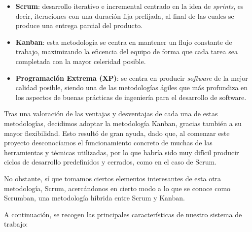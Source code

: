\begin{itemize}
	\item [\textbullet] \textbf{Scrum}: desarrollo iterativo e incremental centrado en la idea de \emph{sprints}, es decir, iteraciones con una duración fija prefijada, al final de las cuales se produce una entrega parcial del producto.
	\item [\textbullet] \textbf{Kanban}: esta metodología se centra en mantener un flujo constante de trabajo, maximizando la eficencia del equipo de forma que cada tarea sea completada con la mayor celeridad posible.
	\item [\textbullet] \textbf{Programación Extrema (XP)}: se centra en producir \emph{software} de la mejor calidad posible, siendo una de las metodologías ágiles que más profundiza en los aspectos de buenas prácticas de ingeniería para el desarrollo de software.
\end{itemize}

Tras una valoración de las ventajas y desventajas de cada una de estas metodologías, decidimos adoptar la metodología Kanban, gracias también a su mayor flexibilidad. Esto resultó de gran ayuda, dado que, al comenzar este proyecto desconocíamos el funcionamiento concreto de muchas de las herramientas y técnicas utilizadas, por lo que habría sido muy difícil producir ciclos de desarrollo predefinidos y cerrados, como en el caso de Scrum.

No obstante, sí que tomamos ciertos elementos interesantes de esta otra metodología, Scrum, acercándonos en cierto modo a lo que se conoce como Scrumban, una metodología híbrida entre Scrum y Kanban.

A continuación, se recogen las principales características de nuestro sistema de trabajo:

\vspace{-0.5cm}

